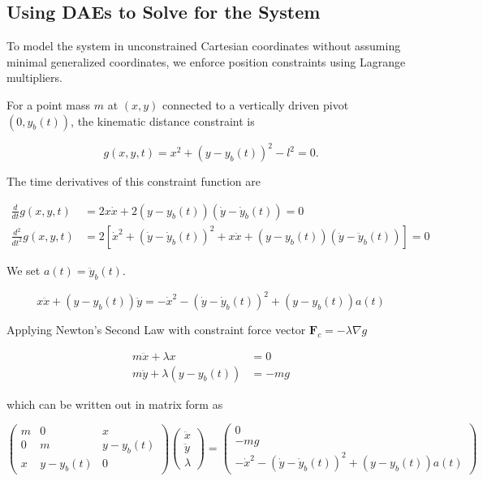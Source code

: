 \subsection{Using DAEs to Solve for the System}

To model the system in unconstrained Cartesian coordinates without assuming minimal generalized coordinates, we enforce position constraints using Lagrange multipliers.

For a point mass $m$ at $(x, y)$ connected to a vertically driven pivot $(0, y_b(t))$, the kinematic distance constraint is

\begin{equation}
    g(x, y, t) = x^2 + (y - y_b(t))^2 - l^2 = 0.
\end{equation}

The time derivatives of this constraint function are

\begin{align}
    \frac{d}{dt}g(x, y, t) &= 2x\dot{x} + 2(y - y_b(t))(\dot{y} - \dot{y}_b(t)) = 0 \\
    \frac{d^2}{dt^2}g(x, y, t) &= 2\left[ \dot{x}^2 + (\dot{y} - \dot{y}_b(t))^2 + x\ddot{x} + (y - y_b(t))(\ddot{y} - \ddot{y}_b(t)) \right] = 0
\end{align}

We set $a(t) = \ddot{y}_b(t)$.

\begin{equation}
    x\ddot{x} + (y - y_b(t))\ddot{y} = -\dot{x}^2 - (\dot{y} - \dot{y}_b(t))^2 + (y - y_b(t))a(t)
\end{equation}

Applying Newton's Second Law with constraint force vector $\mathbf{F}_c = -\lambda \nabla g$

\begin{align}
m\ddot{x} + \lambda x &= 0 \\
m\ddot{y} + \lambda (y - y_b(t)) &= -mg
\end{align}

which can be written out in matrix form as

\begin{equation}
\begin{pmatrix}
m & 0 & x \\
0 & m & y - y_b(t) \\
x & y - y_b(t) & 0
\end{pmatrix}
\begin{pmatrix}
\ddot{x} \\
\ddot{y} \\
\lambda
\end{pmatrix}
=
\begin{pmatrix}
0 \\
-mg \\
-\dot{x}^2 - (\dot{y} - \dot{y}_b(t))^2 + (y - y_b(t))a(t)
\end{pmatrix}
\end{equation}

